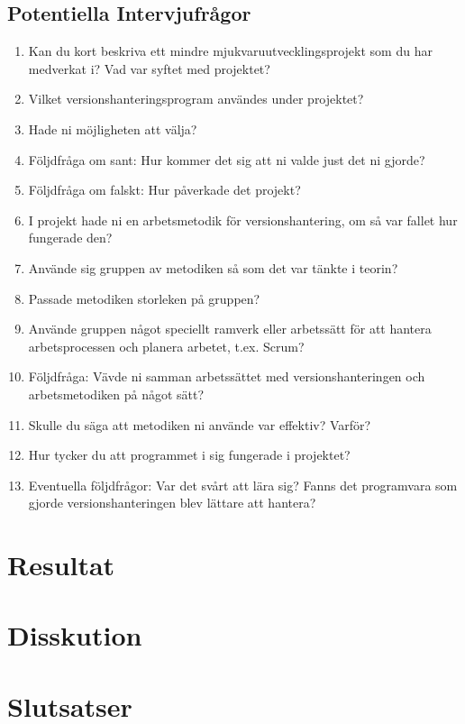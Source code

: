 \subsection{ Potentiella Intervjufrågor } \vspace{1em}
\begin{enumerate}

  \item Kan du kort beskriva ett mindre mjukvaruutvecklingsprojekt som du har medverkat i? Vad var syftet med projektet?

  \item Vilket versionshanteringsprogram användes under projektet?

  \item Hade ni möjligheten att välja?

  \item Följdfråga om sant: Hur kommer det sig att ni valde just det ni gjorde?
  \item Följdfråga om falskt: Hur påverkade det projekt?

  \item I projekt hade ni en arbetsmetodik för versionshantering, om så var fallet hur fungerade den?

  \item Använde sig gruppen av metodiken så som det var tänkte i teorin?

  \item Passade metodiken storleken på gruppen?

  \item Använde gruppen något speciellt ramverk eller arbetssätt för att hantera arbetsprocessen och planera arbetet, t.ex. Scrum?

  \item Följdfråga: Vävde ni samman arbetssättet med versionshanteringen och arbetsmetodiken på något sätt?

  \item Skulle du säga att metodiken ni använde var effektiv? Varför?

  \item Hur tycker du att programmet i sig fungerade i projektet?
  \item Eventuella följdfrågor: Var det svårt att lära sig? Fanns det programvara som gjorde versionshanteringen blev lättare att hantera?

\end{enumerate}

\vspace{1.5em}
\section{Resultat}


\vspace{1.5em}
\section{Disskution}


\vspace{1.5em}
\section{Slutsatser}
